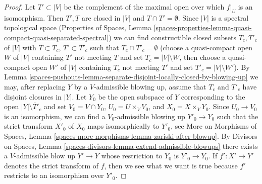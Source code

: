 \begin{proof}
Let $T' \subset |V|$ be the complement of the maximal open over which
$f|_U$ is an isomorphism. Then $T', T$ are closed in $|V|$ and
$T \cap T' = \emptyset$. Since $|V|$ is a spectral topological space
(Properties of Spaces, Lemma
\ref{spaces-properties-lemma-quasi-compact-quasi-separated-spectral})
we can find constructible closed subsets $T_c, T'_c$ of $|V|$
with $T \subset T_c$, $T' \subset T'_c$ such that
$T_c \cap T'_c = \emptyset$ (choose a quasi-compact
open $W$ of $|V|$ containing $T'$ not meeting $T$
and set $T_c = |V| \setminus W$, then choose a quasi-compact
open $W'$ of $|V|$ containing $T_c$ not meeting $T'$
and set $T'_c = |V| \setminus W'$).
By Lemma \ref{spaces-pushouts-lemma-separate-disjoint-locally-closed-by-blowing-up}
we may, after replacing $Y$ by a $V$-admissible blowing up,
assume that $T_c$ and $T'_c$ have disjoint closures in $|Y|$.
Let $Y_0$ be the open subspace of $Y$ corresponding to the open
$|Y| \setminus \overline{T}'_c$ and set $V_0 = V \cap Y_0$,
$U_0 = U \times_V V_0$, and $X_0 = X \times_Y Y_0$.
Since $U_0 \to V_0$ is an isomorphism, we can find a
$V_0$-admissible blowing up $Y'_0 \to Y_0$ such that the
strict transform $X'_0$ of $X_0$ maps isomorphically to $Y'_0$, see
More on Morphisms of Spaces, Lemma
\ref{spaces-more-morphisms-lemma-zariski-after-blowup}.
By Divisors on Spaces, Lemma
\ref{spaces-divisors-lemma-extend-admissible-blowups}
there exists a $V$-admissible blow up $Y' \to Y$ whose restriction
to $Y_0$ is $Y'_0 \to Y_0$. If $f' : X' \to Y'$ denotes the
strict transform of $f$, then we see what we want is true because
$f'$ restricts to an isomorphism over $Y'_0$.
\end{proof}


